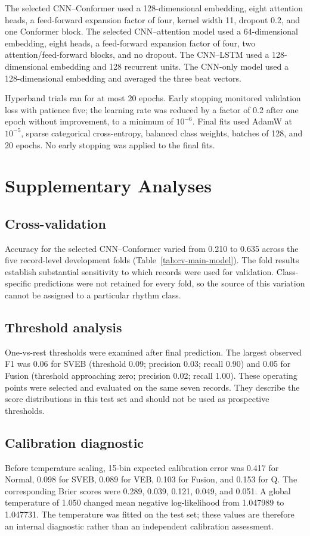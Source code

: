 The selected CNN--Conformer used a 128-dimensional embedding, eight attention heads, a feed-forward expansion factor of four, kernel width 11, dropout 0.2, and one Conformer block. The selected CNN--attention model used a 64-dimensional embedding, eight heads, a feed-forward expansion factor of four, two attention/feed-forward blocks, and no dropout. The CNN--LSTM used a 128-dimensional embedding and 128 recurrent units. The CNN-only model used a 128-dimensional embedding and averaged the three beat vectors.

Hyperband trials ran for at most 20 epochs. Early stopping monitored validation loss with patience five; the learning rate was reduced by a factor of 0.2 after one epoch without improvement, to a minimum of $10^{-6}$. Final fits used AdamW at $10^{-5}$, sparse categorical cross-entropy, balanced class weights, batches of 128, and 20 epochs. No early stopping was applied to the final fits.

\section{Supplementary Analyses}

\subsection{Cross-validation}
Accuracy for the selected CNN--Conformer varied from 0.210 to 0.635 across the five record-level development folds (Table~\ref{tab:cv-main-model}). The fold results establish substantial sensitivity to which records were used for validation. Class-specific predictions were not retained for every fold, so the source of this variation cannot be assigned to a particular rhythm class.



\subsection{Threshold analysis}
One-vs-rest thresholds were examined after final prediction. The largest observed F1 was 0.06 for SVEB (threshold 0.09; precision 0.03; recall 0.90) and 0.05 for Fusion (threshold approaching zero; precision 0.02; recall 1.00). These operating points were selected and evaluated on the same seven records. They describe the score distributions in this test set and should not be used as prospective thresholds.

\subsection{Calibration diagnostic}
Before temperature scaling, 15-bin expected calibration error was 0.417 for Normal, 0.098 for SVEB, 0.089 for VEB, 0.103 for Fusion, and 0.153 for Q. The corresponding Brier scores were 0.289, 0.039, 0.121, 0.049, and 0.051. A global temperature of 1.050 changed mean negative log-likelihood from 1.047989 to 1.047731. The temperature was fitted on the test set; these values are therefore an internal diagnostic rather than an independent calibration assessment.

